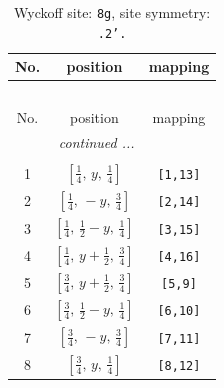 \documentclass[fleqn,8pt]{jsarticle}
\begin{document}
\renewcommand{\arraystretch}{1.2}
\begin{longtable}{ccc}
\caption{Wyckoff site: {\tt 8g}, site symmetry: {\tt .2'.}}
 \\
 \hline \hline
No. & position & mapping \\ \hline \endfirsthead

\multicolumn{2}{l}{\tablename\ \thetable{}} \\
 \hline \hline
No. & position & mapping \\ \hline \endhead

 \hline \hline
\multicolumn{2}{r}{\footnotesize\it continued ...} \\ \endfoot

 \hline \hline
\multicolumn{2}{r}{} \\ \endlastfoot

1 & $\left[ \frac{1}{4},\, y,\, \frac{1}{4} \right]$ & {\tt [1,13]} \\ \hline
2 & $\left[ \frac{1}{4},\, - y,\, \frac{3}{4} \right]$ & {\tt [2,14]} \\ \hline
3 & $\left[ \frac{1}{4},\, \frac{1}{2} - y,\, \frac{1}{4} \right]$ & {\tt [3,15]} \\ \hline
4 & $\left[ \frac{1}{4},\, y + \frac{1}{2},\, \frac{3}{4} \right]$ & {\tt [4,16]} \\ \hline
5 & $\left[ \frac{3}{4},\, y + \frac{1}{2},\, \frac{3}{4} \right]$ & {\tt [5,9]} \\ \hline
6 & $\left[ \frac{3}{4},\, \frac{1}{2} - y,\, \frac{1}{4} \right]$ & {\tt [6,10]} \\ \hline
7 & $\left[ \frac{3}{4},\, - y,\, \frac{3}{4} \right]$ & {\tt [7,11]} \\ \hline
8 & $\left[ \frac{3}{4},\, y,\, \frac{1}{4} \right]$ & {\tt [8,12]} \\
\end{longtable}
\renewcommand{\arraystretch}{1.2}
\end{document}
